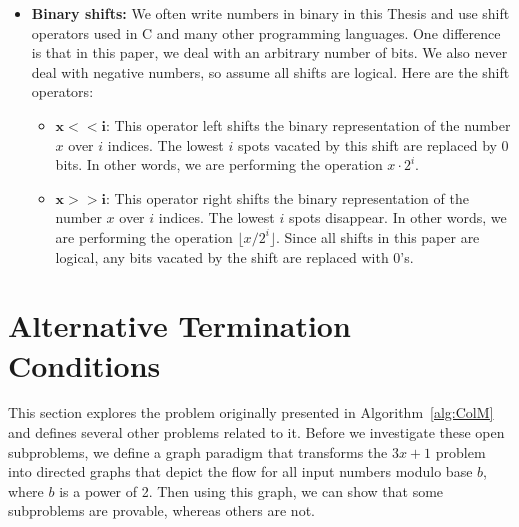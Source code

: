 \documentclass[12pt]{article}
\theoremstyle{definition}
\begin{document}
\begin{itemize}
    \item \textbf{Binary shifts:} We often write numbers in binary in this Thesis and use shift operators used in C and many other programming languages. One difference is that in this paper, we deal with an arbitrary number of bits. We also never deal with negative numbers, so assume all shifts are logical. Here are the shift operators:
    \begin{itemize}
        \item $\boldsymbol{x<<i}$: This operator left shifts the binary representation of the number $x$ over $i$ indices. The lowest $i$ spots vacated by this shift are replaced by 0 bits. In other words, we are performing the operation $x\cdot 2^i$.
        \item $\boldsymbol{x>>i}$: This operator right shifts the binary representation of the number $x$ over $i$ indices. The lowest $i$ spots disappear. In other words, we are performing the operation $\lfloor x / 2^i \rfloor$. Since all shifts in this paper are logical, any bits vacated by the shift are replaced with 0's.
    \end{itemize}
\end{itemize}

\section{Alternative Termination Conditions} \label{sec:alttercdns}
 This section explores the problem originally presented in Algorithm~\ref{alg:ColM} and defines several other problems related to it. Before we investigate these open subproblems, we define a graph paradigm that transforms the $3x+1$ problem into directed graphs that depict the flow for all input numbers modulo base $b$, where $b$ is a power of 2. Then using this graph, we can show that some subproblems are provable, whereas others are not.
\end{document}
